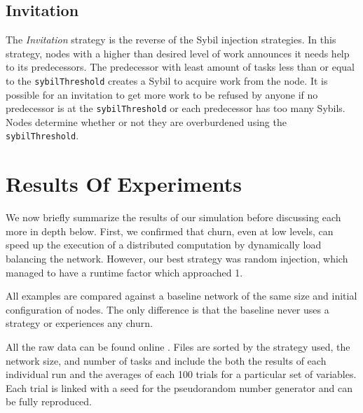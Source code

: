 \documentclass[11pt,letterpaper]{article}
\begin{document}
\subsection{Invitation}
The \textit{Invitation} strategy is the reverse of the Sybil injection strategies.
In  this strategy, nodes with a higher than desired level of work announces it needs help to its predecessors.
The predecessor with least amount of tasks less than or equal to the \texttt{sybilThreshold} creates a Sybil to acquire work from the node.
It is possible for an invitation to get more work to be refused by anyone if no  predecessor is at the \texttt{sybilThreshold} or each predecessor has too many Sybils.
Nodes determine whether or not they are overburdened using the \texttt{sybilThreshold}.



\section{Results Of Experiments}
\label{sec:autonomous-results}

We now briefly summarize the results of our simulation before discussing each more in depth below.
First, we confirmed that churn, even at low levels, can speed up the execution of a distributed computation by dynamically load balancing the network.
However, our best strategy was random injection, which managed to have a runtime factor which approached 1.

All examples are compared against a baseline network of the same size and initial configuration of nodes. 
The only difference is that the baseline never uses a strategy or experiences any churn.

All the raw data can be found online \cite{simulation-data}.
Files are sorted by the strategy used, the network size,  and number of tasks and include the both the results of each individual run and the averages of each 100 trials for a particular set of variables.
Each trial is linked with a seed for the pseudorandom number generator and can be fully reproduced.
\end{document}
